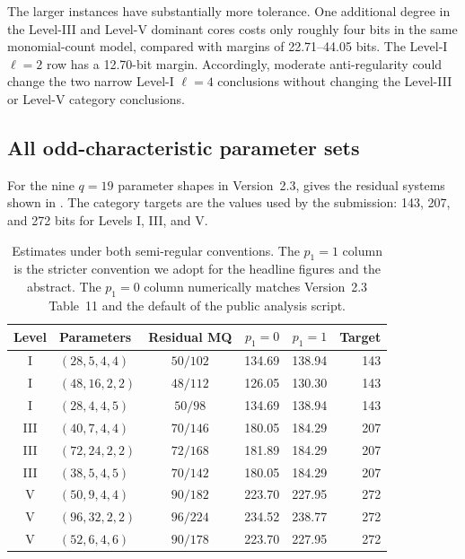 \documentclass[11pt]{article}
\begin{document}
The larger instances have substantially more tolerance.  One additional degree
in the Level-III and Level-V dominant cores costs only roughly four bits in the
same monomial-count model, compared with margins of 22.71--44.05 bits.  The
Level-I $\ell=2$ row has a 12.70-bit margin.  Accordingly, moderate
anti-regularity could change the two narrow Level-I $\ell=4$ conclusions without
changing the Level-III or Level-V category conclusions.

\subsection{All odd-characteristic parameter sets}

For the nine $q=19$ parameter shapes in Version~2.3,  gives the residual systems shown in .  The category targets are the values used by the submission: 143, 207, and 272 bits for Levels I, III, and V.

\begin{table}[t]
\centering
\caption{Estimates under both semi-regular conventions.  The $p_1=1$ column is the stricter convention we adopt for the headline figures and the abstract.  The $p_1=0$ column numerically matches Version~2.3 Table~11 and the default of the public analysis script.}\label{tab:both}
\small
\setlength{\tabcolsep}{4pt}
\begin{tabular}{@{}c l c r r r@{}}
\toprule
Level & Parameters & Residual MQ & $p_1=0$ & $p_1=1$ & Target\\
\midrule
I   & $(28,5,4,4)$  & $50/102$ & 134.69 & 138.94 & 143\\
I   & $(48,16,2,2)$ & $48/112$ & 126.05 & 130.30 & 143\\
I   & $(28,4,4,5)$  & $50/98$  & 134.69 & 138.94 & 143\\
III & $(40,7,4,4)$  & $70/146$ & 180.05 & 184.29 & 207\\
III & $(72,24,2,2)$ & $72/168$ & 181.89 & 184.29 & 207\\
III & $(38,5,4,5)$  & $70/142$ & 180.05 & 184.29 & 207\\
V   & $(50,9,4,4)$  & $90/182$ & 223.70 & 227.95 & 272\\
V   & $(96,32,2,2)$ & $96/224$ & 234.52 & 238.77 & 272\\
V   & $(52,6,4,6)$  & $90/178$ & 223.70 & 227.95 & 272\\
\bottomrule
\end{tabular}
\end{table}
\end{document}
